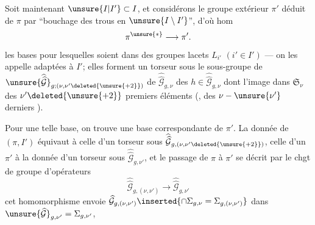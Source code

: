 
Soit maintenant $\unsure{I|I'}\subset I$,  et considérons le groupe extérieur $\pi'$ déduit de $\pi$ par ``bouchage des trous en $\unsure{I\setminus I'}$'', d'où hom
\[
\pi^{\unsure{*}}\longrightarrow\pi'.
\]
  les bases  pour lesquelles    soient dans des  groupes  lacets  $L_{i'}$ $(i'\in I')$ --- on les appelle adaptées à $I'$; elles forment un torseur  sous le sous-groupe de  $\unsure{\widehat{\widehat{\mathcal G}}}_{g;(\nu,\nu'\deleted{\unsure{+2}})}$ de $\widehat{\widehat{\mathcal G}}_{g,\nu}$   des $h\in\widehat{\widehat{\mathcal G}}_{g,\nu}$ dont l'image dans $\mathfrak S_\nu$   des $\nu'\deleted{\unsure{+2}}$ premiers éléments (, des $\nu-\unsure{\nu'}$ derniers ).


Pour une telle base, on trouve une base correspondante de $\pi'$.  La donnée de $(\pi,I')$ équivaut à celle d'un torseur sous $\widehat{\widehat{\mathcal G}}_{g,(\nu,\nu'\deleted{\unsure{+2}})}$, celle d'un $\pi'$ à  la donnée d'un torseur sous $\widehat{\widehat{\mathcal G}}_{g,\nu'}$, et le passage de $\pi$ à $\pi'$ se décrit par le chgt de groupe d'opérateurs
\[
\widehat{\widehat{\mathcal G}}_{g,(\nu,\nu')}\longrightarrow\widehat{\widehat{\mathcal G}}_{g,\nu'}
\]
cet homomorphisme envoie $\widehat{\mathcal G}_{g,(\nu,\nu')}\inserted{\cap\Sigma_{g,\nu}=\Sigma_{g,(\nu,\nu')}}$ dans $\unsure{\widehat{\mathcal G}}_{g,\nu'}=\Sigma_{g,\nu'}$,

